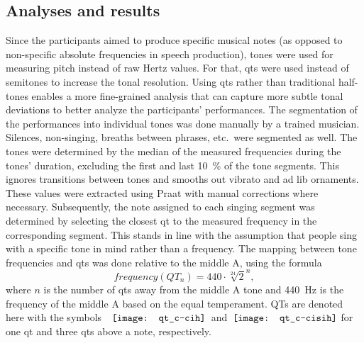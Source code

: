 \subsection{Analyses and results}
\label{subsec:results_music}

Since the participants aimed to produce specific musical notes (as opposed to non-specific absolute frequencies in speech production), tones were used for measuring pitch instead of raw Hertz values.
For that, \acfp{qt} were used instead of semitones to increase the tonal resolution.
Using \acp{qt} rather than traditional half-tones enables a more fine-grained analysis that can capture more subtle tonal deviations to better analyze the participants' performances.
The segmentation of the performances into individual tones was done manually by a trained musician.
Silences, non-singing, breaths between phrases, etc.\ were segmented as well.
The tones were determined by the median of the measured frequencies during the tones' duration, excluding the first and last \SI{10}{\percent} of the tone segments.
This ignores transitions between tones and smooths out vibrato and ad lib ornaments.
These values were extracted using Praat \citep{Boersma2018praat} with manual corrections where necessary.
Subsequently, the note assigned to each singing segment was determined by selecting the closest \ac{qt} to the measured frequency in the corresponding segment.
This stands in line with the assumption that people sing with a specific tone in mind rather than a frequency.
The mapping between tone frequencies and \acp{qt} was done relative to the middle A, using the formula \citep[adapted from][]{DeKlerk1979equal}
%
\begin{equation}
	\label{eq:quarter_tones_formula}
	frequency(QT_n) = 440 \cdot \sqrt[24]{2}^n,
\end{equation}
\noindent
%
where $n$ is the number of \acp{qt} away from the middle A tone and \SI{440}{\hertz} is the frequency of the middle A based on the equal temperament.
QTs are denoted here with the symbols~\hspace{-0.26cm}~$\vcenter{\hbox{\texttt{[image: qt\_c-cih]}}}$~and~$\vcenter{\hbox{\texttt{[image: qt\_c-cisih]}}}$ for one \ac{qt} and three \acp{qt} above a note, respectively.
